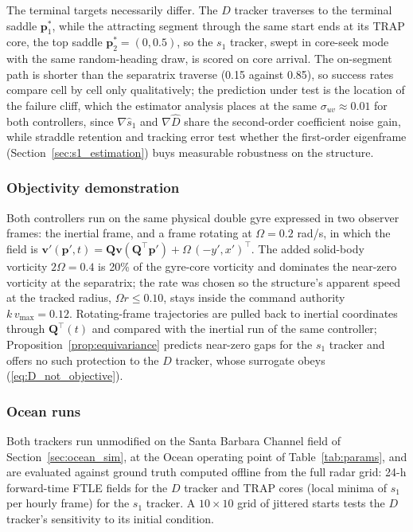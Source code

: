 \documentclass[lettersize,journal]{IEEEtran}
\begin{document}
The terminal targets necessarily differ. The $D$ tracker traverses to
the terminal saddle $\mathbf{p}^*_1$, while the attracting segment
through the same start ends at its TRAP core, the top saddle
$\mathbf{p}^*_2 = (0, 0.5)$, so the $s_1$ tracker, swept in core-seek
mode with the same random-heading draw, is scored on core arrival. The
on-segment path is shorter than the separatrix traverse (0.15 against
0.85), so success rates compare cell by cell only qualitatively; the
prediction under test is the location of the failure cliff, which the
estimator analysis places at the same $\sigma_{uv} \approx 0.01$ for
both controllers, since $\nabla\hat{s}_1$ and $\nabla\hat{D}$ share
the second-order coefficient noise gain, while straddle retention and
tracking error test whether the first-order eigenframe
(Section~\ref{sec:s1_estimation}) buys measurable robustness on the
structure.

\subsubsection{Objectivity demonstration}
Both controllers run on the same physical double gyre expressed in two
observer frames: the inertial frame, and a frame rotating at
$\Omega = 0.2$ rad/s, in which the field is
$\mathbf{v}'(\mathbf{p}', t) = \mathbf{Q}\mathbf{v}(\mathbf{Q}^\top
\mathbf{p}') + \Omega\,(-y', x')^\top$. The added solid-body vorticity
$2\Omega = 0.4$ is 20\% of the gyre-core vorticity and dominates the
near-zero vorticity at the separatrix; the rate was chosen so the
structure's apparent speed at the tracked radius, $\Omega r \leq
0.10$, stays inside the command authority $k\,v_{\max} = 0.12$.
Rotating-frame trajectories are pulled back to inertial coordinates
through $\mathbf{Q}^\top(t)$ and compared with the inertial run of the
same controller; Proposition~\ref{prop:equivariance} predicts
near-zero gaps for the $s_1$ tracker and offers no such protection to
the $D$ tracker, whose surrogate obeys (\ref{eq:D_not_objective}).

\subsubsection{Ocean runs}
Both trackers run unmodified on the Santa Barbara Channel field of
Section~\ref{sec:ocean_sim}, at the Ocean operating point of
Table~\ref{tab:params}, and are evaluated against ground truth
computed offline from the full radar grid: 24-h forward-time FTLE
fields for the $D$ tracker and TRAP cores (local minima of $s_1$ per
hourly frame) for the $s_1$ tracker. A $10 \times 10$ grid of jittered
starts tests the $D$ tracker's sensitivity to its initial condition.
\end{document}
